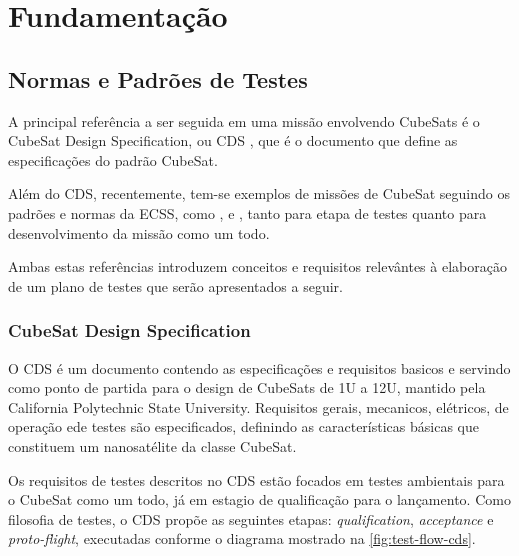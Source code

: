 \chapter{Fundamentação}\label{cap:fundamentacao}


\section{Normas e Padrões de Testes}\label{sec:normas-ecss}

A principal referência a ser seguida em uma missão envolvendo CubeSats é o CubeSat Design Specification, ou \gls{CDS} \cite{cds}, que é o documento que define as especificações do padrão CubeSat.

Além do \gls{CDS}, recentemente, tem-se exemplos de missões de CubeSat seguindo os padrões e normas da \gls{ECSS}, como \textcite{floripasat-1}, \textcite{tailoring-ecss-nanosat} e \textcite{mist-eps}, tanto para etapa de testes quanto para desenvolvimento da missão como um todo.

Ambas estas referências introduzem conceitos e requisitos relevântes à elaboração de um plano de testes que serão apresentados a seguir.

\subsection{CubeSat Design Specification}

O \gls{CDS} é um documento contendo as especificações e requisitos basicos e servindo como ponto de partida para o design de CubeSats de 1U a 12U, mantido pela California Polytechnic State University.
Requisitos gerais, mecanicos, elétricos, de operação ede testes são especificados, definindo as características básicas que constituem um nanosatélite da classe CubeSat.

Os requisitos de testes descritos no \gls{CDS} estão focados em testes ambientais para o CubeSat como um todo, já em estagio de qualificação para o lançamento.
Como filosofia de testes, o \gls{CDS} propõe as seguintes etapas: \textit{qualification}, \textit{acceptance} e \textit{proto-flight}, executadas conforme o diagrama mostrado na \autoref{fig:test-flow-cds}.

